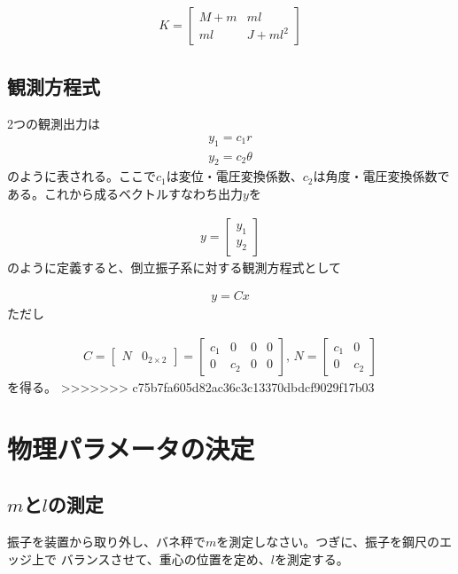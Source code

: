 \documentclass[a4j,11pt,twoside]{ujbook}
\begin{document}
			\begin{eqnarray*}
				K = \left[
				\begin{array}{cc}
					M+m & ml \\
					ml & J+ml^2
				\end{array}
				\right]
			\end{eqnarray*}

	\subsection{観測方程式}
	2つの観測出力は
	\begin{eqnarray*}
		y_1 = c_1r\\
		y_2 = c_2\theta
	\end{eqnarray*}
	のように表される。ここで$c_1$は変位・電圧変換係数、$c_2$は角度・電圧変換係数である。これから成るベクトルすなわち出力$y$を

	\begin{eqnarray*}
		y = \left[
		\begin{array}{c}
			y_1\\
			y_2
		\end{array}
		\right]
	\end{eqnarray*}
	のように定義すると、倒立振子系に対する観測方程式として

	\begin{eqnarray*}
		y = Cx
	\end{eqnarray*}
	ただし

	\begin{eqnarray}
		C 
		= 
		\left[
			\begin{array}{cc}
				N & 0_{2\times2}
			\end{array}
		\right] 
		=
		\left[
			\begin{array}{cccc}
				c_1 &  0  & 0 & 0\\
				0  & c_2 & 0 & 0
			\end{array}
		\right],\,
		N 
		=
		\left[
			\begin{array}{cc}
				c_1 &  0 \\
				0  & c_2
			\end{array}
		\right]
		\label{eq:C,N}
	\end{eqnarray}
	を得る。
>>>>>>> c75b7fa605d82ac36c3c13370dbdcf9029f17b03

\section{物理パラメータの決定}
	\subsection{$m$と$l$の測定}
	振子を装置から取り外し、バネ秤で$m$を測定しなさい。つぎに、振子を鋼尺のエッジ上で
	バランスさせて、重心の位置を定め、$l$を測定する。
\end{document}

